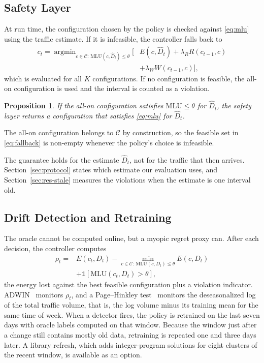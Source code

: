 \documentclass[journal]{IEEEtran}
\newtheorem{proposition}{Proposition}
\begin{document}
\subsection{Safety Layer}

At run time, the configuration chosen by the policy is checked against \eqref{eq:mlu} using the traffic estimate. If it is infeasible, the controller falls back to
\begin{equation}\label{eq:fallback}
\begin{split}c_t=\mathop{\arg\min}_{c\in\mathcal{C}:\,\mathrm{MLU}(c,\hat D_t)\le\theta}\Big[&E(c,\hat D_t)+\lambda_R R(c_{t-1},c)\\
&+\lambda_W W(c_{t-1},c)\Big],\end{split}
\end{equation}
which is evaluated for all $K$ configurations. If no configuration is feasible, the all-on configuration is used and the interval is counted as a violation.
\begin{proposition}\label{prop:safety}
If the all-on configuration satisfies $\mathrm{MLU}\le\theta$ for $\hat D_t$, the safety layer returns a configuration that satisfies \eqref{eq:mlu} for $\hat D_t$.
\end{proposition}
\begin{IEEEproof}
The all-on configuration belongs to $\mathcal{C}$ by construction, so the feasible set in \eqref{eq:fallback} is non-empty whenever the policy's choice is infeasible.
\end{IEEEproof}
The guarantee holds for the estimate $\hat D_t$, not for the traffic that then arrives. Section~\ref{sec:protocol} states which estimate our evaluation uses, and Section~\ref{sec:res-stale} measures the violations when the estimate is one interval old.

\subsection{Drift Detection and Retraining}\label{sec:drift}

The oracle cannot be computed online, but a myopic regret proxy can. After each decision, the controller computes
\begin{equation}\label{eq:proxy}
\begin{split}\rho_t=&E(c_t,D_t)-\min_{c\in\mathcal{C}:\,\mathrm{MLU}(c,D_t)\le\theta}E(c,D_t)\\
&+\mathbb{1}[\mathrm{MLU}(c_t,D_t)>\theta],\end{split}
\end{equation}
the energy lost against the best feasible configuration plus a violation indicator. ADWIN~\cite{bifet2007adwin} monitors $\rho_t$, and a Page--Hinkley test~\cite{page1954cusum} monitors the deseasonalized log of the total traffic volume, that is, the log volume minus its training mean for the same time of week. When a detector fires, the policy is retrained on the last seven days with oracle labels computed on that window. Because the window just after a change still contains mostly old data, retraining is repeated one and three days later. A library refresh, which adds integer-program solutions for eight clusters of the recent window, is available as an option.
\end{document}
